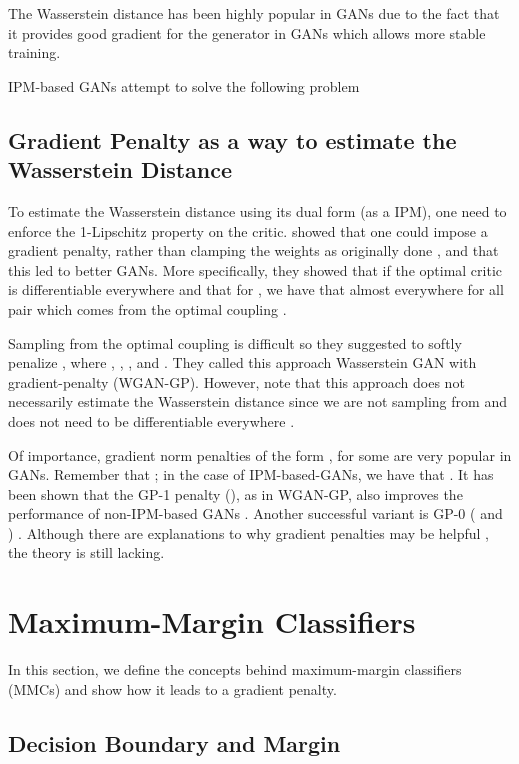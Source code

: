 \documentclass{article}
\begin{document}
The Wasserstein distance has been highly popular in GANs due to the fact that it provides good gradient for the generator in GANs which allows more stable training.

IPM-based GANs \citep{WGAN, WGAN-GP} attempt to solve the following problem 

\subsection{Gradient Penalty as a way to estimate the Wasserstein Distance}
\label{sec:GANs}

To estimate the Wasserstein distance using its dual form (as a IPM), one need to enforce the 1-Lipschitz property on the critic. \citet{WGAN-GP} showed that one could impose a gradient penalty, rather than clamping the weights as originally done \citep{WGAN}, and that this led to better GANs. More specifically, they showed that if the optimal critic  is differentiable everywhere and that  for , we have that  almost everywhere for all pair  which comes from the optimal coupling . 

Sampling from the optimal coupling is difficult so they suggested to softly penalize , where , , , and . They called this approach Wasserstein GAN with gradient-penalty (WGAN-GP). However, note that this approach does not necessarily estimate the Wasserstein distance since we are not sampling from  and  does not need to be differentiable everywhere \citep{petzka2017regularization}.

Of importance, gradient norm penalties of the form , for some  are very popular in GANs. Remember that ; in the case of IPM-based-GANs, we have that . It has been shown that the GP-1 penalty (), as in WGAN-GP, also improves the performance of non-IPM-based GANs \citep{ManyPaths}. Another successful variant is GP-0 ( and ) \citep{mescheder2018training,karras2019style}. Although there are explanations to why gradient penalties may be helpful \citep{mescheder2018training, kodali2017convergence, WGAN-GP}, the theory is still lacking.

\section{Maximum-Margin Classifiers}
\label{sec:3}

In this section, we define the concepts behind maximum-margin classifiers (MMCs) and show how it leads to a gradient penalty.

\subsection{Decision Boundary and Margin}
\end{document}
